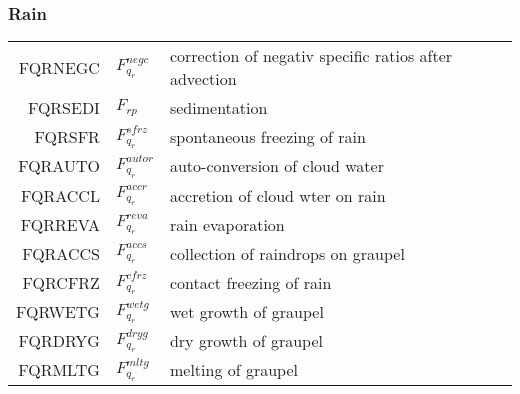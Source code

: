   \subsubsection{Rain}
  \begin{tabular}{rll}

       FQRNEGC      &$F_{q_r}^{negc}$ &correction of negativ specific ratios after advection\\
       FQRSEDI      &$F_{rp}$ &sedimentation\\
       FQRSFR       &$F_{q_r}^{sfrz}$ &spontaneous freezing of rain\\
       FQRAUTO      &$F_{q_r}^{autor}$ &auto-conversion of cloud water\\
       FQRACCL      &$F_{q_r}^{accr}$ &accretion of cloud wter on rain\\
       FQRREVA      &$F_{q_r}^{reva}$ &rain evaporation\\
       FQRACCS      &$F_{q_r}^{accs}$ &collection of raindrops on graupel\\
       FQRCFRZ      &$F_{q_r}^{cfrz}$ &contact freezing of rain\\
       FQRWETG      &$F_{q_r}^{wetg}$ &wet growth of graupel\\
       FQRDRYG      &$F_{q_r}^{dryg}$ &dry growth of graupel\\
       FQRMLTG      &$F_{q_r}^{mltg}$ &melting of graupel\\
  \end{tabular}

